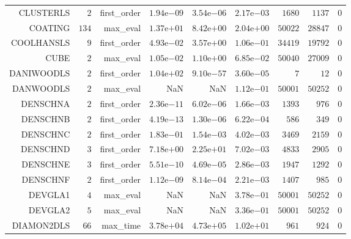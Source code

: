 \begin{longtable}{rrrrrrrrr}
CLUSTERLS & \(     2\) & first\_order & \( 1.94\)e\(-09\) & \( 3.54\)e\(-06\) & \( 2.17\)e\(-03\) & \(  1680\) & \(  1137\) & \(     0\) \\
COATING & \(   134\) & max\_eval & \( 1.37\)e\(+01\) & \( 8.42\)e\(+00\) & \( 2.04\)e\(+00\) & \( 50022\) & \( 28847\) & \(     0\) \\
COOLHANSLS & \(     9\) & first\_order & \( 4.93\)e\(-02\) & \( 3.57\)e\(+00\) & \( 1.06\)e\(-01\) & \( 34419\) & \( 19792\) & \(     0\) \\
CUBE & \(     2\) & max\_eval & \( 1.05\)e\(-02\) & \( 1.10\)e\(+00\) & \( 6.85\)e\(-02\) & \( 50040\) & \( 27009\) & \(     0\) \\
DANIWOODLS & \(     2\) & first\_order & \( 1.04\)e\(+02\) & \( 9.10\)e\(-57\) & \( 3.60\)e\(-05\) & \(     7\) & \(    12\) & \(     0\) \\
DANWOODLS & \(     2\) & max\_eval &       NaN &       NaN & \( 1.12\)e\(-01\) & \( 50001\) & \( 50252\) & \(     0\) \\
DENSCHNA & \(     2\) & first\_order & \( 2.36\)e\(-11\) & \( 6.02\)e\(-06\) & \( 1.66\)e\(-03\) & \(  1393\) & \(   976\) & \(     0\) \\
DENSCHNB & \(     2\) & first\_order & \( 4.19\)e\(-13\) & \( 1.30\)e\(-06\) & \( 6.22\)e\(-04\) & \(   586\) & \(   349\) & \(     0\) \\
DENSCHNC & \(     2\) & first\_order & \( 1.83\)e\(-01\) & \( 1.54\)e\(-03\) & \( 4.02\)e\(-03\) & \(  3469\) & \(  2159\) & \(     0\) \\
DENSCHND & \(     3\) & first\_order & \( 7.18\)e\(+00\) & \( 2.25\)e\(+01\) & \( 7.02\)e\(-03\) & \(  4833\) & \(  2905\) & \(     0\) \\
DENSCHNE & \(     3\) & first\_order & \( 5.51\)e\(-10\) & \( 4.69\)e\(-05\) & \( 2.86\)e\(-03\) & \(  1947\) & \(  1292\) & \(     0\) \\
DENSCHNF & \(     2\) & first\_order & \( 1.12\)e\(-09\) & \( 8.14\)e\(-04\) & \( 2.21\)e\(-03\) & \(  1407\) & \(   985\) & \(     0\) \\
DEVGLA1 & \(     4\) & max\_eval &       NaN &       NaN & \( 3.78\)e\(-01\) & \( 50001\) & \( 50252\) & \(     0\) \\
DEVGLA2 & \(     5\) & max\_eval &       NaN &       NaN & \( 3.36\)e\(-01\) & \( 50001\) & \( 50252\) & \(     0\) \\
DIAMON2DLS & \(    66\) & max\_time & \( 3.78\)e\(+04\) & \( 4.73\)e\(+05\) & \( 1.02\)e\(+01\) & \(   961\) & \(   924\) & \(     0\) \\

\end{longtable}
